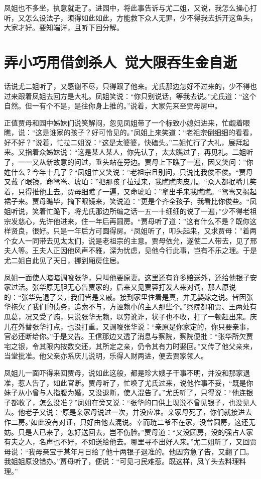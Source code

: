 \documentclass[12pt,oneside]{book}
\begin{document}
凤姐也不多坐，执意就走了。进园中，将此事告诉与尤二姐，又说，我怎么操心打听，又怎么设法子，须得如此如此，方能救下众人无罪，少不得我去拆开这鱼头，大家才好。要知端详，且听下回分解。
 
\chapter{弄小巧用借剑杀人~觉大限吞生金自逝}
话说尤二姐听了，又感谢不尽，只得跟了他来。尤氏那边怎好不过来的，少不得也过来跟着凤姐去回方是大礼。凤姐笑说：“你只别说话，等我去说。”尤氏道：“这个自然。但一有个不是，是往你身上推的。”说着，大家先来至贾母房中。

正值贾母和园中姊妹们说笑解闷，忽见凤姐带了一个标致小媳妇进来，忙觑着眼瞧，说：“这是谁家的孩子？好可怜见的。”凤姐上来笑道：“老祖宗倒细细的看看，好不好？”说着，忙拉二姐说：“这是太婆婆，快磕头。”二姐忙行了大礼，展拜起来。又指着众姊妹说：“这是某人某人，你先认了，太太瞧过了，再见礼。二姐听了，一一又从新故意的问过，垂头站在旁边。贾母上下瞧了一遍，因又笑问：”你姓什么？今年十几了？“凤姐忙又笑说：”老祖宗且别问，只说比我俊不俊。“贾母又戴了眼镜，命鸳鸯、琥珀：”把那孩子拉过来，我瞧瞧肉皮儿。“众人都抿嘴儿笑着，只得推他上去。贾母细瞧了一遍，又命琥珀：”拿出手来我瞧瞧。“鸳鸯又揭起裙子来。贾母瞧毕，摘下眼镜来，笑说道：”更是个齐全孩子，我看比你俊些。“凤姐听说，笑着忙跪下，将尤氏那边所编之话一五一十细细的说了一遍，”少不得老祖宗发慈心，先许他进来，住一年后再圆房。“贾母听了道：”这有什么不是？既你这样贤良，很好。只是一年后方可圆得房。“凤姐听了，叩头起来，又求贾母：”着两个女人一同带去见太太们，说是老祖宗的主意。贾母依允，遂使二人带去，见了邢夫人等。王夫人正因他风声不雅，深为忧虑，见他今行此事，岂有不乐之理。于是尤二姐自此见了天日，挪到厢房住居。

凤姐一面使人暗暗调唆张华，只叫他要原妻。这里还有许多赔送外，还给他银子安家过活。张华原无胆无心告贾家的，后来又见贾蓉打发人来对词，那人原说的：“张华先退了亲，我们皆是亲戚。接到家里住着是真，并无娶嫁之说。皆因张华拖欠了我们的债务，追索不与，方诬赖小的主人那些个。”察院都和贾、王两处有瓜葛，况又受了贿，只说张华无赖，以穷讹诈，状子也不收，打了一顿赶出来。庆儿在外替张华打点，也没打重。又调唆张华说：“亲原是你家定的，你只要亲事，官必还断给你。”于是又告。王信那边又透了消息与察院，察院便批：“张华所欠贾宅之银，令其限内按数交还，其所定之亲，仍令其有力时娶回。”又传了他父亲来，当堂批准。他父亲亦系庆儿说明，乐得人财两进，便去贾家领人。

凤姐儿一面吓得来回贾母，说如此这般，都是珍大嫂子干事不明，并没和那家退准，惹人告了，如此官断。贾母听了，忙唤了尤氏过来，说他作事不妥，“既是你妹子从小曾与人指腹为婚，又没退断，使人混告了。”尤氏听了，只得说：“他连银子都收了，怎么没准？”凤姐在旁又说：“张华的口供上现说不曾见银子，也没见人去。他老子又说：‘原是亲家母说过一次，并没应准。亲家母死了，你们就接进去作二房。’如此没有对证，只好由他去混说。幸而琏二爷不在家，没曾圆房，这还无妨。只是人已来了，怎好送回去，岂不伤脸。”贾母道：“又没圆房，没的强占人家有夫之人，名声也不好，不如送给他去。哪里寻不出好人来。”尤二姐听了，又回贾母说：“我母亲宝于某年月日给了他十两银子退准的。他因穷急了告，又翻了口。我姐姐原没错办。”贾母听了，便说：“可见刁民难惹。既这样，凤丫头去料理料理。”
\end{document}
